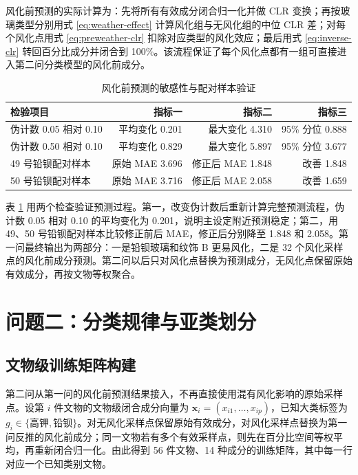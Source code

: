 \documentclass[UTF8,zihao=-4,a4paper,fontset=fandol]{ctexart}
\begin{document}
风化前预测的实际计算为：先将所有有效成分闭合归一化并做 CLR 变换；再按玻璃类型分别用式 \eqref{eq:weather-effect} 计算风化组与无风化组的中位 CLR 差；对每个风化点用式 \eqref{eq:preweather-clr} 扣除对应类型的风化效应；最后用式 \eqref{eq:inverse-clr} 转回百分比成分并闭合到 100\%。该流程保证了每个风化点都有一组可直接进入第二问分类模型的风化前成分。

\begin{table}[H]
  \centering
  \caption{风化前预测的敏感性与配对样本验证}
  \label{tab:q1-validation}
  \begin{tabular}{lrrr}
    \toprule
    检验项目 & 指标一 & 指标二 & 指标三 \\
    \midrule
    伪计数 0.05 相对 0.10 & 平均变化 0.201 & 最大变化 4.310 & 95\% 分位 0.888 \\
    伪计数 0.50 相对 0.10 & 平均变化 0.829 & 最大变化 5.897 & 95\% 分位 3.677 \\
    49 号铅钡配对样本 & 原始 MAE 3.696 & 修正后 MAE 1.848 & 改善 1.848 \\
    50 号铅钡配对样本 & 原始 MAE 3.716 & 修正后 MAE 2.058 & 改善 1.659 \\
    \bottomrule
  \end{tabular}
\end{table}

表 \ref{tab:q1-validation} 用两个检查验证预测过程。第一，改变伪计数后重新计算完整预测流程，伪计数 0.05 相对 0.10 的平均变化为 0.201，说明主设定附近预测稳定；第二，用 49、50 号铅钡配对样本比较修正前后 MAE，修正后分别降至 1.848 和 2.058。第一问最终输出为两部分：一是铅钡玻璃和纹饰 B 更易风化，二是 32 个风化采样点的风化前成分预测。第二问以后只对风化点替换为预测成分，无风化点保留原始有效成分，再按文物等权聚合。

\section{问题二：分类规律与亚类划分}

\subsection{文物级训练矩阵构建}

第二问从第一问的风化前预测结果接入，不再直接使用混有风化影响的原始采样点。设第 $i$ 件文物的文物级闭合成分向量为 $\bm x_i=(x_{i1},\ldots,x_{ip})$，已知大类标签为 $g_i\in\{\text{高钾},\text{铅钡}\}$。对无风化采样点保留原始有效成分，对风化采样点替换为第一问反推的风化前成分；同一文物若有多个有效采样点，则先在百分比空间等权平均，再重新闭合归一化。由此得到 56 件文物、14 种成分的训练矩阵，其中每一行对应一个已知类别文物。
\end{document}
